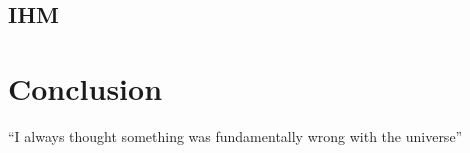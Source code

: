 \documentclass{report}
\begin{document}
		\section{IHM}
			
			
\chapter{Conclusion}
	``I always thought something was fundamentally wrong with the universe'' \citep{adams1995hitchhiker}	
		
		
\end{document}
